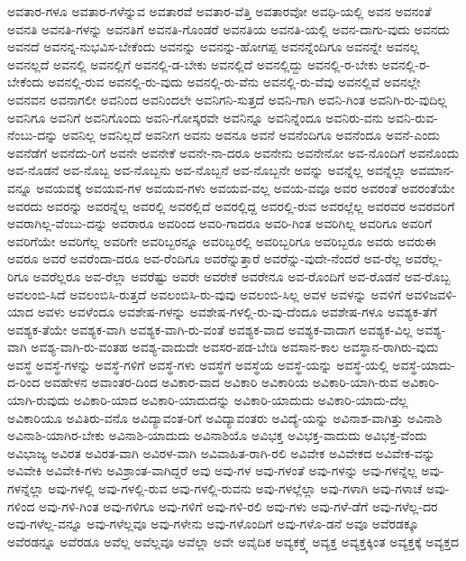 {ಅವತಾರ-ಗಳೂ
ಅವತಾರ-ಗಳೆನ್ನುವ
ಅವತಾರವೆ
ಅವತಾರ-ವೆತ್ತಿ
ಅವತಾರವೋ
ಅವಧಿ-ಯಲ್ಲಿ
ಅವನ
ಅವನಂತೆ
ಅವನತಿ
ಅವನತಿ-ಗಳನ್ನು
ಅವನತಿಗೆ
ಅವನತಿ-ಗೊಂಡರೆ
ಅವನತಿಯ
ಅವನತಿ-ಯಲ್ಲಿ
ಅವನ-ದಾಗು-ವುದು
ಅವನದು
ಅವನದೆ
ಅವನನ್ನ-ನುಭವಿಸ-ಬೇಕೆಂದು
ಅವನನ್ನು
ಅವನನ್ನು-ಹೋಗಪ್ಪ
ಅವನನ್ನೆಂದಿಗೂ
ಅವನನ್ನೇ
ಅವನಲ್ಲ
ಅವನಲ್ಲದೆ
ಅವನಲ್ಲಿ
ಅವನಲ್ಲಿಗೆ
ಅವನಲ್ಲಿ-ಡ-ಬೇಕು
ಅವನಲ್ಲಿದೆ
ಅವನಲ್ಲಿದ್ದು
ಅವನಲ್ಲಿ-ರ-ಬೇಕು
ಅವನಲ್ಲಿ-ರ-ಬೇಕೆಂದು
ಅವನಲ್ಲಿ-ರುವ
ಅವನಲ್ಲಿ-ರು-ವುದು
ಅವನಲ್ಲಿ-ರು-ವೆನು
ಅವನಲ್ಲಿ-ರು-ವೆವು
ಅವನಲ್ಲಿವೆ
ಅವನಲ್ಲೇ
ಅವನವನ
ಅವನಾಗಲೀ
ಅವನಿಂದ
ಅವನಿಂದಲೇ
ಅವನಿಗನಿ-ಸುತ್ತದೆ
ಅವನಿ-ಗಾಗಿ
ಅವನಿ-ಗಿಂತ
ಅವನಿಗಿ-ರು-ವುದಿಲ್ಲ
ಅವನಿಗೂ
ಅವನಿಗೆ
ಅವನಿಗೊಂದು
ಅವನಿ-ಗೋಸ್ಕರವೇ
ಅವನಿನ್ನೂ
ಅವನಿನ್ನೆಂದೂ
ಅವನಿರು-ವನು
ಅವನಿ-ರುವ-ನೆಂಬು-ದನ್ನು
ಅವನಿಲ್ಲ
ಅವನಿಲ್ಲದೆ
ಅವನೀಗ
ಅವನು
ಅವನೂ
ಅವನೆ
ಅವನೆಂದಿಗೂ
ಅವನೆಂದೂ
ಅವನೆ-ಎಂದು
ಅವನೆಡೆಗೆ
ಅವನೆದು-ರಿಗೆ
ಅವನೇ
ಅವನೇಕೆ
ಅವನೇ-ನಾ-ದರೂ
ಅವನೇನು
ಅವನೇನೋ
ಅವ-ನೊಂದಿಗೆ
ಅವನೊಂದು
ಅವ-ನೊಡನೆ
ಅವ-ನೊಬ್ಬ
ಅವ-ನೊಬ್ಬನು
ಅವ-ನೊಬ್ಬನೆ
ಅವ-ನೊಬ್ಬನೇ
ಅವನ್ನು
ಅವನ್ನೆಲ್ಲ
ಅವನ್ನೆಲ್ಲಾ
ಅವಮಾನ-ವನ್ನೂ
ಅವಯವಕ್ಕೆ
ಅವಯವ-ಗಳ
ಅವಯವ-ಗಳು
ಅವಯವ-ವಲ್ಲ
ಅವಯ-ವವೂ
ಅವರ
ಅವರಂತೆ
ಅವರಂತೆಯೇ
ಅವರದು
ಅವರನ್ನು
ಅವರನ್ನೆಲ್ಲ
ಅವರಲ್ಲಿ
ಅವರಲ್ಲಿದೆ
ಅವರಲ್ಲಿದ್ದ
ಅವರಲ್ಲಿ-ರುವ
ಅವರಲ್ಲೆಲ್ಲ
ಅವರವರ
ಅವರವರಿಗೆ
ಅವರಾಗಿಲ್ಲ-ವೆಂಬು-ದನ್ನು
ಅವರಾರೂ
ಅವರಿಂದ
ಅವರಿ-ಗಾದರೂ
ಅವರಿ-ಗಿಂತ
ಅವರಿಗಿಲ್ಲ
ಅವರಿಗೂ
ಅವರಿಗೆ
ಅವರಿಗೆಯೇ
ಅವರಿಗೆಲ್ಲ
ಅವರಿಗೇ
ಅವರಿಬ್ಬರನ್ನೂ
ಅವರಿಬ್ಬರಲ್ಲಿ
ಅವರಿಬ್ಬರಿಗೂ
ಅವರಿಬ್ಬರೂ
ಅವರು
ಅವರುಈ
ಅವರೂ
ಅವರೆ
ಅವರೆಂದಾ-ದರೂ
ಅವ-ರೆಂದಿಗೂ
ಅವರೆನ್ನುತ್ತಾರೆ
ಅವರೆನ್ನು-ವುದೇ-ನೆಂದರೆ
ಅವ-ರೆಲ್ಲ
ಅವರೆಲ್ಲ-ರಿಗೂ
ಅವರೆಲ್ಲರೂ
ಅವ-ರೆಲ್ಲಾ
ಅವರೆಷ್ಟು
ಅವರೇ
ಅವರೇಕೆ
ಅವರೇನೂ
ಅವ-ರೊಂದಿಗೆ
ಅವ-ರೊಡನೆ
ಅವ-ರೊಬ್ಬ
ಅವಲಂಬಿ-ಸಿದೆ
ಅವಲಂಬಿಸಿ-ರುತ್ತದೆ
ಅವಲಂಬಿಸಿ-ರು-ವುವು
ಅವಲಂಬಿ-ಸಿಲ್ಲ
ಅವಳ
ಅವಳನ್ನು
ಅವಳಿಗೆ
ಅವಳಿಜವಳಿ-ಯಾದ
ಅವಳು
ಅವಳೆಂದೂ
ಅವಶೇಷ-ಗಳನ್ನು
ಅವಶೇಷ-ಗಳಲ್ಲಿ-ರು-ವು-ದೆಂದೂ
ಅವಶೇಷ-ಗಳೂ
ಅವಶ್ಯಕ-ತೆಗೆ
ಅವಶ್ಯಕ-ತೆಯೇ
ಅವಶ್ಯಕ-ವಾಗಿ
ಅವಶ್ಯಕ-ವಾಗಿ-ರು-ವಂತೆ
ಅವಶ್ಯಕ-ವಾದ
ಅವಶ್ಯಕ-ವಾದಾಗ
ಅವಶ್ಯಕ-ವಿಲ್ಲ
ಅವಶ್ಯ-ವಾಗಿ
ಅವಶ್ಯ-ವಾಗಿ-ರು-ವಂತಹ
ಅವಶ್ಯ-ವಾದುದೇ
ಅವಸರ-ಪಡ-ಬೇಡಿ
ಅವಸಾನ-ಕಾಲ
ಅವಸ್ಥಾನ-ರಾಗಿರು-ವುದು
ಅವಸ್ಥೆ
ಅವಸ್ಥೆ-ಗಳನ್ನು
ಅವಸ್ಥೆ-ಗಳಿಗೆ
ಅವಸ್ಥೆ-ಗಳು
ಅವಸ್ಥೆಗೆ
ಅವಸ್ಥೆಯ
ಅವಸ್ಥೆ-ಯನ್ನು
ಅವಸ್ಥೆ-ಯಲ್ಲಿ
ಅವಸ್ಥೆ-ಯಾದು-ದ-ರಿಂದ
ಅವಹೇಳನ
ಅವಾಂತರ-ದಿಂದ
ಅವಿಕಾರ-ವಾದ
ಅವಿಕಾರಿ
ಅವಿಕಾರಿಯ
ಅವಿಕಾರಿ-ಯಾಗಿ-ರುವ
ಅವಿಕಾರಿ-ಯಾಗಿ-ರುವುದು
ಅವಿಕಾರಿ-ಯಾದ
ಅವಿಕಾರಿ-ಯಾದುದನ್ನು
ಅವಿಕಾರಿ-ಯಾದುದು
ಅವಿಕಾರಿ-ಯಾದು-ದೆಲ್ಲ
ಅವಿಕಾರಿಯೂ
ಅವಿತಿರು-ವನೊ
ಅವಿದ್ಯಾವಂತ-ರಿಗೆ
ಅವಿದ್ಯಾವಂತರು
ಅವಿದ್ಯೆ-ಯನ್ನು
ಅವಿನಾಶ-ವಾಗಿತ್ತು
ಅವಿನಾಶಿ
ಅವಿನಾಶಿ-ಯಾಗಿರ-ಬೇಕು
ಅವಿನಾಶಿ-ಯಾದುದು
ಅವಿನಾಶಿಯೊ
ಅವಿಭಕ್ತ
ಅವಿಭಕ್ತ-ವಾದುದು
ಅವಿಭಕ್ತ-ವೆಂದು
ಅವಿಭಾಜ್ಯ
ಅವಿರತ
ಅವಿರತ-ವಾಗಿ
ಅವಿರಳ-ವಾಗಿ
ಅವಿವಾಹಿತ-ರಾಗಿ-ರಲಿ
ಅವಿವೇಕ
ಅವಿವೇಕದ
ಅವಿವೇಕ-ವನ್ನು
ಅವಿವೇಕಿ
ಅವಿವೇಕಿ-ಗಳು
ಅವಿಶ್ರಾಂತ-ವಾಗಿದ್ದರೆ
ಅವು
ಅವು-ಗಳ
ಅವು-ಗಳಂತೆ
ಅವು-ಗಳನ್ನು
ಅವು-ಗಳನ್ನೆಲ್ಲ
ಅವು-ಗಳನ್ನೆಲ್ಲಾ
ಅವು-ಗಳಲ್ಲಿ
ಅವು-ಗಳಲ್ಲಿ-ರುವ
ಅವು-ಗಳಲ್ಲಿ-ರುವನು
ಅವು-ಗಳಲ್ಲೆಲ್ಲಾ
ಅವು-ಗಳಾಗಿ
ಅವು-ಗಳಾಚೆ
ಅವು-ಗಳಿಂದ
ಅವು-ಗಳಿ-ಗಿಂತ
ಅವು-ಗಳಿಗೂ
ಅವು-ಗಳಿಗೆ
ಅವು-ಗಳಿ-ರಲಿ
ಅವು-ಗಳು
ಅವು-ಗಳೆ-ಡೆಗೆ
ಅವು-ಗಳೆಲ್ಲ-ದರ
ಅವು-ಗಳೆಲ್ಲ-ವನ್ನೂ
ಅವು-ಗಳೆಲ್ಲವೂ
ಅವು-ಗಳೇನು
ಅವು-ಗಳೊಂದಿಗೆ
ಅವು-ಗಳೊ-ಡನೆ
ಅವೂ
ಅವೆರಡಕ್ಕೂ
ಅವೆರಡನ್ನೂ
ಅವೆರಡೂ
ಅವೆಲ್ಲ
ಅವೆಲ್ಲವೂ
ಅವೆಲ್ಲಾ
ಅವೇ
ಅವೈದಿಕ
ಅವ್ಯಕಕ್ತ್ಕೆ
ಅವ್ಯಕ್ತ
ಅವ್ಯಕ್ತಕ್ಕಿಂತ
ಅವ್ಯಕ್ತಕ್ಕೆ
ಅವ್ಯಕ್ತದ
}

